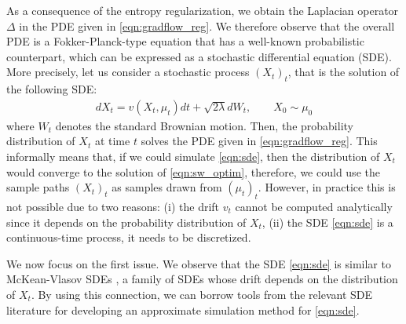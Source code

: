 %
% 
As a consequence of the entropy regularization, we obtain the Laplacian operator $\Delta$ in the PDE given in \eqref{eqn:gradflow_reg}. We therefore observe that the overall PDE is a Fokker-Planck-type equation \cite{bogachev2015fokker} that has a well-known probabilistic counterpart, which can be expressed as a stochastic differential equation (SDE). More precisely, let us consider a stochastic process $(X_t)_{t}$, that is the solution of the following SDE:
\begin{align}
d X_t = v(X_t,\mu_t) dt + \sqrt{2 \lambda } d W_t, \qquad X_0 \sim \mu_0 \label{eqn:sde}
\end{align}
where $W_t$ denotes the standard Brownian motion. Then, the probability distribution of $X_t$ at time $t$ solves the PDE given in \eqref{eqn:gradflow_reg}. This informally means that, if we could simulate \eqref{eqn:sde}, then the distribution of $X_t$ would converge to the solution of \eqref{eqn:sw_optim}, therefore, we could use the sample paths $(X_t)_t$ as samples drawn from $(\mu_t)_t$. However, in practice this is not possible due to two reasons: (i) the drift $v_t$ cannot be computed analytically since it depends on the probability distribution of $X_t$, (ii) the SDE \eqref{eqn:sde} is a continuous-time process, it needs to be discretized.








We now focus on the first issue.
% 
We observe that the SDE \eqref{eqn:sde} is similar to McKean-Vlasov SDEs \cite{veretennikov2006ergodic,mishura2016existence}, a family of SDEs whose drift depends on the distribution of $X_t$. By using this connection, we can borrow tools from the relevant SDE literature \cite{malrieu03,cgm-08} for developing an approximate simulation method for \eqref{eqn:sde}.


